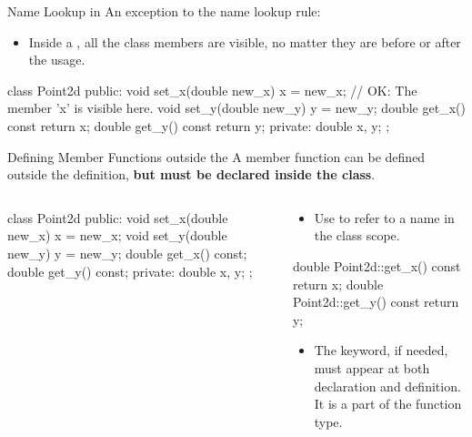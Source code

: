 \documentclass{beamer}
\begin{document}
\begin{frame}[fragile]{Name Lookup in \class}
    An exception to the name lookup rule:
    \begin{itemize}
        \item Inside a \class, all the class members are visible, no matter they are before or after the usage.
    \end{itemize}
    \begin{cpp}
class Point2d {
 public:
  void set_x(double new_x)
    { x = new_x; }      // OK: The member 'x' is visible here.
  void set_y(double new_y)
    { y = new_y; }
  double get_x() const
    { return x; }
  double get_y() const
    { return y; }
 private:
  double x, y;
};
    \end{cpp}
\end{frame}

\begin{frame}[fragile]{Defining Member Functions outside the \class}
    A member function can be defined outside the \class definition, \textbf{but must be declared inside the class}.
    \begin{columns}
        \begin{column}{0.5\linewidth}
            \begin{cpp}
class Point2d {
 public:
  void set_x(double new_x) {
    x = new_x;
  }
  void set_y(double new_y) {
    y = new_y;
  }
  double get_x() const;
  double get_y() const;
 private:
  double x, y;
};
            \end{cpp}        
        \end{column}
        \begin{column}{0.5\linewidth}
            \begin{itemize}
                \item Use  to refer to a name in the class scope.
            \end{itemize}
            \begin{cpp}
double Point2d::get_x() const {
  return x;
}
double Point2d::get_y() const {
  return y;
}
            \end{cpp}
            \begin{itemize}
                \item The \const keyword, if needed, must appear at both declaration and definition. It is a part of the function type.
            \end{itemize}
        \end{column}
    \end{columns}
\end{frame}
\end{document}

